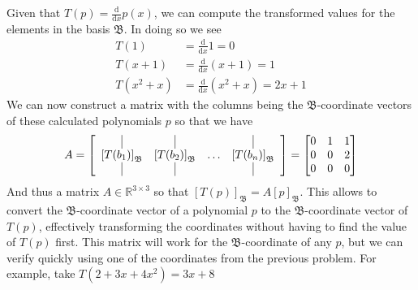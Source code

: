 \documentclass{report}
\begin{document}
\sol Given that $T(p) = \frac{\mathrm{d}}{\mathrm{d}x}p(x)$,  we can compute the transformed values for the elements in the basis $\mathfrak{B}$.  In doing so we see
$$
\begin{aligned}
T(1) & = \frac{\mathrm{d}}{\mathrm{d} x}1 = 0 \\
T(x+1) & = \frac{\mathrm{d}}{\mathrm{d} x}(x+1) = 1 \\
T(x^2 + x) & = \frac{\mathrm{d}}{\mathrm{d} x}(x^2+x) = 2x+1
\end{aligned}
$$
We can now construct a matrix with the columns being the $\mathfrak{B}$-coordinate vectors of these calculated polynomials $p$ so that we have
$$
A = \left[
  \begin{array}{cccc}
    \vrule & \vrule & & \vrule\\
    \left[T(b_{1})\right]_{\mathfrak{B}} & \left[T(b_{2})\right]_{\mathfrak{B}} & \ldots & \left[T(b_{n})\right]_{\mathfrak{B}} \\
    \vrule & \vrule & & \vrule 
  \end{array}
\right] =
\begin{bmatrix}
0 & 1 & 1 \\
0 & 0 & 2 \\
0 & 0 & 0
\end{bmatrix}
$$
And thus a matrix $A\in\mathbb{R}^{3\times3}$ so that $[T(p)]_{\mathfrak{B}}=A[p]_{\mathfrak{B}}$.  This allows to convert the $\mathfrak{B}$-coordinate vector of a polynomial $p$ to the $\mathfrak{B}$-coordinate vector of $T(p)$,  effectively transforming the coordinates without having to find the value of $T(p)$ first.  This matrix will work for the $\mathfrak{B}$-coordinate of any $p$,  but we can verify quickly using one of the coordinates from the previous problem.  For example,  take $T(2 + 3x +4x^2) = 3x + 8$
\end{document}

